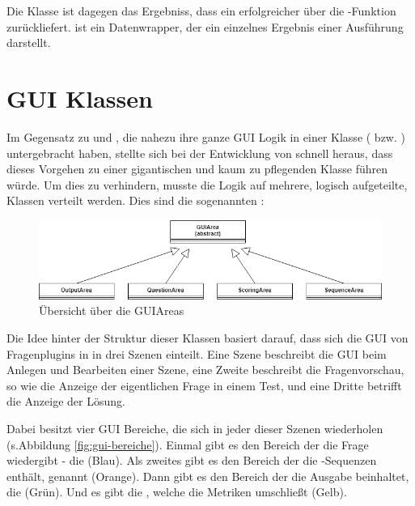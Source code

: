 Die Klasse  ist dagegen das Ergebniss, dass ein erfolgreicher  über die -Funktion zurückliefert.  ist ein Datenwrapper, der ein einzelnes Ergebnis einer Ausführung darstellt.

\section{GUI Klassen}
\label{sec:gui-klassen}

Im Gegensatz zu  und , die nahezu ihre ganze GUI Logik in einer Klasse ( bzw. )  untergebracht haben, stellte sich bei der Entwicklung von  schnell heraus, dass dieses Vorgehen zu einer gigantischen und kaum zu pflegenden Klasse führen würde. Um dies zu verhindern, musste die Logik auf mehrere, logisch aufgeteilte, Klassen verteilt werden. Dies sind die sogenannten :

    \begin{figure}[H]
        \begin{center}
            \includegraphics[page=1, width=0.7\paperwidth, trim=0 0 0 0, clip]{fig/GUIArea.png} 
            \caption{Übersicht über die GUIAreas}
            \label{fig:sql-run}
        \end{center}
    \end{figure}

Die Idee hinter der Struktur dieser Klassen basiert darauf, dass sich die GUI von Fragenplugins in  in drei Szenen einteilt. Eine Szene beschreibt die GUI beim Anlegen und Bearbeiten einer Szene, eine Zweite beschreibt die Fragenvorschau, so wie die Anzeige der eigentlichen Frage in einem Test, und eine Dritte betrifft die Anzeige der Lösung.

Dabei besitzt  vier GUI Bereiche, die sich in jeder dieser Szenen wiederholen (s.Abbildung \ref{fig:gui-bereiche}). Einmal gibt es den Bereich der die Frage wiedergibt - die  (Blau). Als zweites gibt es den Bereich der die -Sequenzen enthält, genannt  (Orange). Dann gibt es den Bereich der die Ausgabe beinhaltet, die   (Grün). Und es gibt die , welche die Metriken umschließt (Gelb). 

